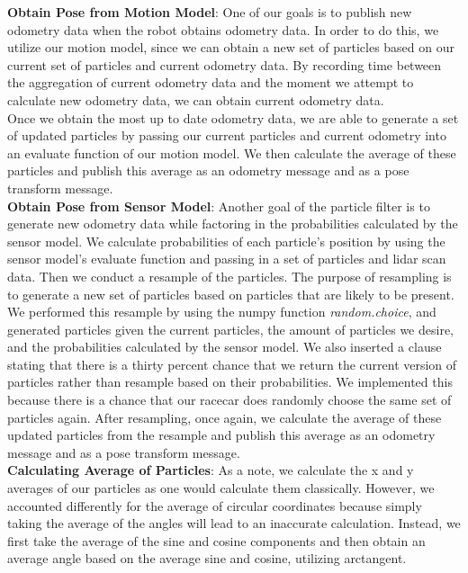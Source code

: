 \documentclass{article}
\begin{document}
\textbf{Obtain Pose from Motion Model}: One of our goals is to publish new odometry data when the robot obtains odometry data. In order to do this, we utilize our motion model, since we can obtain a new set of particles based on our current set of particles and current odometry data. By recording time between the aggregation of current odometry data and the moment we attempt to calculate new odometry data, we can obtain current odometry data. \\
Once we obtain the most up to date odometry data, we are able to generate a set of updated particles by passing our current particles and current odometry into an evaluate function of our motion model. We then calculate the average of these particles and publish this average as an odometry message and as a pose transform message.\\

\textbf{Obtain Pose from Sensor Model}: Another goal of the particle filter is to generate new odometry data while factoring in the probabilities calculated by the sensor model. We calculate probabilities of each particle's position by using the sensor model's evaluate function and passing in a set of particles and lidar scan data. Then we conduct a resample of the particles. The purpose of resampling is to generate a new set of particles based on particles that are likely to be present. We performed this resample by using the numpy function \emph{random.choice}, and generated particles given the current particles, the amount of particles we desire, and the probabilities calculated by the sensor model. We also inserted a clause stating that there is a thirty percent chance that we return the current version of particles rather than resample based on their probabilities. We implemented this because there is a chance that our racecar does randomly choose the same set of particles again. After resampling, once again, we calculate the average of these updated particles from the resample and publish this average as an odometry message and as a pose transform message.\\

\textbf{Calculating Average of Particles}: As a note, we calculate the x and y averages of our particles as one would calculate them classically. However, we accounted differently for the average of circular coordinates because simply taking the average of the angles will lead to an inaccurate calculation. Instead, we first take the average of the sine and cosine components and then obtain an average angle based on the average sine and cosine, utilizing arctangent. \\
\end{document}
